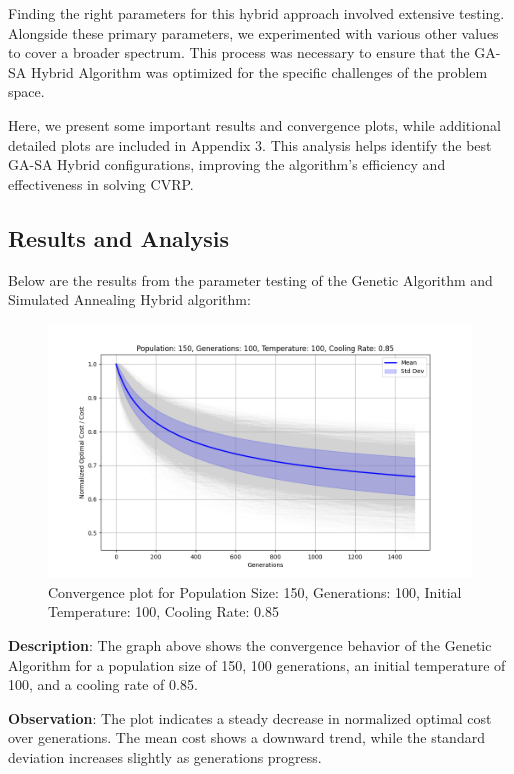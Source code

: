 \documentclass{article}
\begin{document}
    Finding the right parameters for this hybrid approach involved extensive testing. Alongside these primary parameters, we experimented with various other values to cover a broader spectrum. This process was necessary to ensure that the GA-SA Hybrid Algorithm was optimized for the specific challenges of the problem space.

    Here, we present some important results and convergence plots, while additional detailed plots are included in Appendix 3. This analysis helps identify the best GA-SA Hybrid configurations, improving the algorithm's efficiency and effectiveness in solving CVRP.

    \subsection{Results and Analysis}
    Below are the results from the parameter testing of the Genetic Algorithm and Simulated Annealing Hybrid algorithm:

    \begin{figure}[H]
        \centering
        \includegraphics[width=\textwidth]{genetic_simulated_annealing_hybrid/Population_150_Generations_100_Temperature_100_CoolingRate_0.85}
        \caption{Convergence plot for Population Size: 150, Generations: 100, Initial Temperature: 100, Cooling Rate: 0.85}
        \label{fig:pop150_gen100_temp100_cr0.85}
    \end{figure}

    \textbf{Description}: The graph above shows the convergence behavior of the Genetic Algorithm for a population size of 150, 100 generations, an initial temperature of 100, and a cooling rate of 0.85.

    \textbf{Observation}: The plot indicates a steady decrease in normalized optimal cost over generations. The mean cost shows a downward trend, while the standard deviation increases slightly as generations progress.
\end{document}
